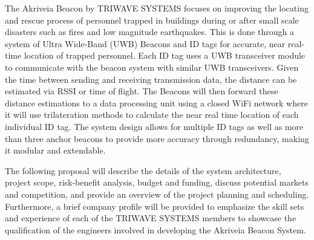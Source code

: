\bigskip
The Akriveia Beacon by TRIWAVE SYSTEMS focuses on improving the locating and rescue process of personnel trapped in buildings during or after small scale disasters such as fires and low magnitude earthquakes. This is done through a system of Ultra Wide-Band (UWB) Beacons and ID tags for accurate, near real-time location of trapped personnel. Each ID tag uses a UWB transceiver module to communicate with the beacon system with similar UWB transceivers. Given the time between sending and receiving transmission data, the distance can be estimated via RSSI or time of flight. The Beacons will then forward these distance estimations to a data processing unit using a closed WiFi network where it will use trilateration methods to calculate the near real time location of each individual ID tag. The system design allows for multiple ID tags as well as more than three anchor beacons to provide more accuracy through redundancy, making it modular and extendable.

\bigskip
The following proposal will describe the details of the system architecture, project scope, risk-benefit analysis, budget and funding, discuss potential markets and competition, and provide an overview of the project planning and scheduling. Furthermore, a brief company profile will be provided to emphasize the skill sets and experience of each of the TRIWAVE SYSTEMS members to showcase the qualification of the engineers involved in developing the Akriveia Beacon System. 
















